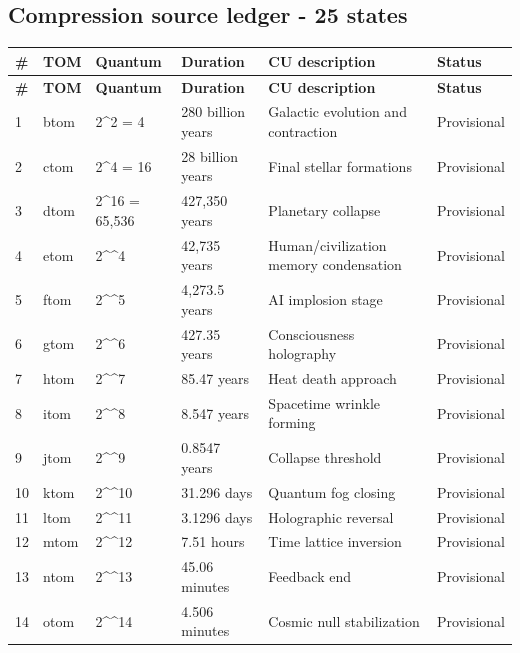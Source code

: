 \documentclass[11pt,letterpaper]{article}
\begin{document}
\subsection{Compression source ledger - 25 states}
\small
\begin{longtable}{L{0.36in}L{0.72in}L{1.12in}L{1.18in}L{2.12in}L{0.72in}}
\toprule
\textbf{\#} & \textbf{TOM} & \textbf{Quantum} & \textbf{Duration} & \textbf{CU description} & \textbf{Status} \\
\midrule
\endfirsthead
\toprule
\textbf{\#} & \textbf{TOM} & \textbf{Quantum} & \textbf{Duration} & \textbf{CU description} & \textbf{Status} \\
\midrule
{} & btom & 2\textasciicircum{}2 = 4 & 280 billion years & Galactic evolution and contraction & Provisional \\
2 & ctom & 2\textasciicircum{}4 = 16 & 28 billion years & Final stellar formations & Provisional \\
3 & dtom & 2\textasciicircum{}16 = 65,536 & 427,350 years & Planetary collapse & Provisional \\
4 & etom & 2\textasciicircum{}\textasciicircum{}4 & 42,735 years & Human/civilization memory condensation & Provisional \\
5 & ftom & 2\textasciicircum{}\textasciicircum{}5 & 4,273.5 years & AI implosion stage & Provisional \\
6 & gtom & 2\textasciicircum{}\textasciicircum{}6 & 427.35 years & Consciousness holography & Provisional \\
7 & htom & 2\textasciicircum{}\textasciicircum{}7 & 85.47 years & Heat death approach & Provisional \\
8 & itom & 2\textasciicircum{}\textasciicircum{}8 & 8.547 years & Spacetime wrinkle forming & Provisional \\
9 & jtom & 2\textasciicircum{}\textasciicircum{}9 & 0.8547 years & Collapse threshold & Provisional \\
10 & ktom & 2\textasciicircum{}\textasciicircum{}10 & 31.296 days & Quantum fog closing & Provisional \\
11 & ltom & 2\textasciicircum{}\textasciicircum{}11 & 3.1296 days & Holographic reversal & Provisional \\
12 & mtom & 2\textasciicircum{}\textasciicircum{}12 & 7.51 hours & Time lattice inversion & Provisional \\
13 & ntom & 2\textasciicircum{}\textasciicircum{}13 & 45.06 minutes & Feedback end & Provisional \\
14 & otom & 2\textasciicircum{}\textasciicircum{}14 & 4.506 minutes & Cosmic null stabilization & Provisional \\

\end{longtable}
\end{document}

